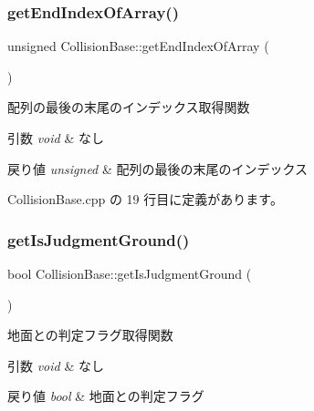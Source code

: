 \subsubsection{\texorpdfstring{get\+End\+Index\+Of\+Array()}{getEndIndexOfArray()}}
{\footnotesize\ttfamily unsigned Collision\+Base\+::get\+End\+Index\+Of\+Array (\begin{DoxyParamCaption}{ }\end{DoxyParamCaption})}



配列の最後の末尾のインデックス取得関数 


\begin{DoxyParams}{引数}
{\em void} & なし \\
\hline
\end{DoxyParams}

\begin{DoxyRetVals}{戻り値}
{\em unsigned} & 配列の最後の末尾のインデックス \\
\hline
\end{DoxyRetVals}


 Collision\+Base.\+cpp の 19 行目に定義があります。

\mbox{\label{class_collision_base_a7b9cd927976308f8719f3becc03b99a1}} 
\subsubsection{\texorpdfstring{get\+Is\+Judgment\+Ground()}{getIsJudgmentGround()}}
{\footnotesize\ttfamily bool Collision\+Base\+::get\+Is\+Judgment\+Ground (\begin{DoxyParamCaption}{ }\end{DoxyParamCaption})}



地面との判定フラグ取得関数 


\begin{DoxyParams}{引数}
{\em void} & なし \\
\hline
\end{DoxyParams}

\begin{DoxyRetVals}{戻り値}
{\em bool} & 地面との判定フラグ \\
\hline
\end{DoxyRetVals}


